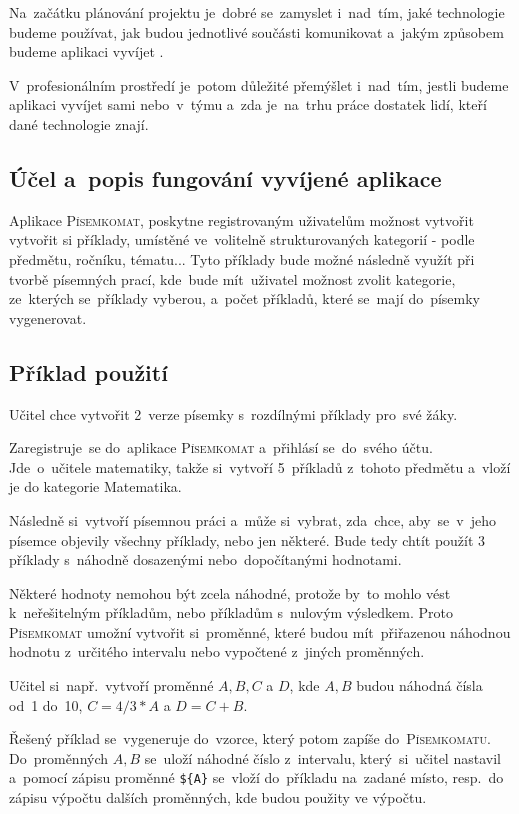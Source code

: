 \documentclass[14pt,a4paper]{article}
\begin{document}
        Na~začátku plánování projektu je~dobré se~zamyslet i~nad~tím, jaké technologie budeme používat, jak budou jednotlivé součásti komunikovat a~jakým způsobem budeme aplikaci vyvíjet \cite{bctynovsky:specifikacepozadavku}.
    
        V~profesionálním prostředí je~potom důležité přemýšlet i~nad~tím, jestli budeme aplikaci vyvíjet sami nebo~v~týmu a~zda je~na~trhu práce dostatek lidí, kteří dané technologie znají.

        \subsection{Účel a~popis fungování vyvíjené aplikace}
        Aplikace \textsc{Písemkomat}, poskytne registrovaným uživatelům možnost vytvořit vytvořit si příklady, umístěné ve~volitelně
        strukturovaných kategorií - podle předmětu, ročníku, tématu... Tyto příklady bude možné následně využít při tvorbě písemných prací,
        kde~bude mít~uživatel možnost zvolit kategorie, ze~kterých se~příklady vyberou, a~počet příkladů, které se~mají do~písemky vygenerovat. 
        \subsection{Příklad použití}
        Učitel chce vytvořit 2~verze písemky s~rozdílnými příklady pro~své žáky.
        
        Zaregistruje~se do~aplikace \textsc{Písemkomat} a~přihlásí se~do~svého účtu. Jde~o~učitele matematiky, takže si~vytvoří 5~příkladů z~tohoto předmětu a~vloží je do kategorie Matematika.

        Následně si~vytvoří písemnou práci a~může si~vybrat, zda~chce, aby~se~v~jeho písemce objevily všechny příklady, nebo jen některé. Bude tedy chtít použít 3\,příklady s~náhodně dosazenými nebo~dopočítanými hodnotami.
        
        Některé hodnoty nemohou být zcela náhodné, protože by~to mohlo vést k~neřešitelným příkladům, nebo příkladům s~nulovým výsledkem.
        Proto \textsc{Písemkomat} umožní vytvořit si~proměnné, které budou mít~přiřazenou náhodnou hodnotu z~určitého intervalu nebo vypočtené z~jiných proměnných.

        Učitel si~např.~vytvoří proměnné $A, B, C$ a $D$, kde $A, B$ budou náhodná čísla od~1 do~10, $C = 4/3*A$ a $D = C + B$.

        Řešený příklad se~vygeneruje do~vzorce, který potom zapíše do~\textsc{Písemkomatu}. Do~proměnných $A, B$ se~uloží náhodné číslo z~intervalu, který~si~učitel nastavil a~pomocí zápisu proměnné \texttt{\$\{A\}} se~vloží do~příkladu na~zadané místo, resp.~do zápisu výpočtu dalších proměnných, kde budou použity ve výpočtu.
        
\end{document}
